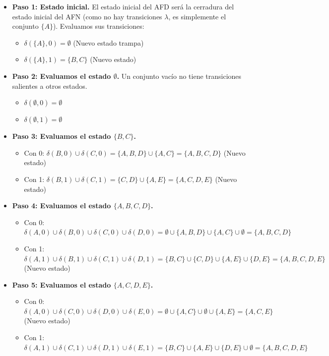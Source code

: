 \documentclass[12pt]{article}
\begin{document}
\begin{itemize}
    \item \textbf{Paso 1: Estado inicial.} El estado inicial del AFD será la cerradura del estado inicial del AFN (como no hay transiciones $\lambda$, es simplemente el conjunto $\{A\}$). Evaluamos sus transiciones:
    \begin{itemize}
        \item $\delta(\{A\}, 0) = \emptyset$ (Nuevo estado trampa)
        \item $\delta(\{A\}, 1) = \{B, C\}$ (Nuevo estado)
    \end{itemize}
    
    \item \textbf{Paso 2: Evaluamos el estado $\emptyset$.} Un conjunto vacío no tiene transiciones salientes a otros estados.
    \begin{itemize}
        \item $\delta(\emptyset, 0) = \emptyset$
        \item $\delta(\emptyset, 1) = \emptyset$
    \end{itemize}

    \item \textbf{Paso 3: Evaluamos el estado $\{B, C\}$.}
    \begin{itemize}
        \item Con 0: $\delta(B, 0) \cup \delta(C, 0) = \{A, B, D\} \cup \{A, C\} = \{A, B, C, D\}$ (Nuevo estado)
        \item Con 1: $\delta(B, 1) \cup \delta(C, 1) = \{C, D\} \cup \{A, E\} = \{A, C, D, E\}$ (Nuevo estado)
    \end{itemize}

    \item \textbf{Paso 4: Evaluamos el estado $\{A, B, C, D\}$.}
    \begin{itemize}
        \item Con 0: $\delta(A, 0) \cup \delta(B, 0) \cup \delta(C, 0) \cup \delta(D, 0) = \emptyset \cup \{A, B, D\} \cup \{A, C\} \cup \emptyset = \{A, B, C, D\}$
        \item Con 1: $\delta(A, 1) \cup \delta(B, 1) \cup \delta(C, 1) \cup \delta(D, 1) = \{B, C\} \cup \{C, D\} \cup \{A, E\} \cup \{D, E\} = \{A, B, C, D, E\}$ (Nuevo estado)
    \end{itemize}

    \item \textbf{Paso 5: Evaluamos el estado $\{A, C, D, E\}$.}
    \begin{itemize}
        \item Con 0: $\delta(A, 0) \cup \delta(C, 0) \cup \delta(D, 0) \cup \delta(E, 0) = \emptyset \cup \{A, C\} \cup \emptyset \cup \{A, E\} = \{A, C, E\}$ (Nuevo estado)
        \item Con 1: $\delta(A, 1) \cup \delta(C, 1) \cup \delta(D, 1) \cup \delta(E, 1) = \{B, C\} \cup \{A, E\} \cup \{D, E\} \cup \emptyset = \{A, B, C, D, E\}$
    \end{itemize}


\end{itemize}
\end{document}

